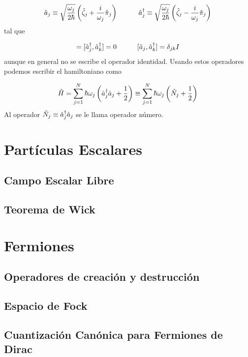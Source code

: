 \begin{equation}
	\hat{{a}}_j \equiv \sqrt{\frac{\omega_j}{2\hbar}} \left( \hat{{\zeta}}_j + \frac{i}{\omega_j}\hat{{\pi}}_j \right) \quad \quad \quad 
	\hat{{a}}_j^\dagger \equiv \sqrt{\frac{\omega_j}{2\hbar}} \left( \hat{{\zeta}}_j - \frac{i}{\omega_j}\hat{{\pi}}_j \right)
\end{equation}
tal que 

\begin{equation}
	[\ha_j,\ha_k]=[\ha_j^\dagger,\ha_k^\dagger]=0 \tquad [\ha_j,\ha^\dagger_k]=\delta_{jk} I
\end{equation}
aunque en general no se escribe el operador identidad. Usando estos operadores podemos escribir el hamiltoniano como

\begin{equation}
	\hat{H} = \sum_{j=1}^N \hbar \omega_j \left( \hat{{a}}^\dagger_j \hat{{a}}_j + \frac{1}{2} \right) \equiv \sum_{j=1}^N \hbar \omega_j \left( \hat{N}_j + \frac{1}{2} \right)
\end{equation}
Al operador $\hat{N}_j\equiv\hat{{a}}^\dagger_j \hat{{a}}_j$ se le llama operador número. 


 


\section{Partículas Escalares}

\subsection{Campo Escalar Libre}

\subsection{Teorema de Wick}

\section{Fermiones}

\subsection{Operadores de creación y destrucción}

\subsection{Espacio de Fock}

\subsection{Cuantización Canónica para Fermiones de Dirac}

